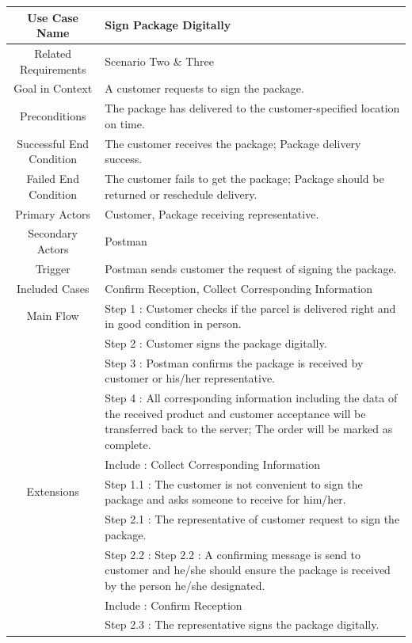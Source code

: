 \documentclass[12pt]{scrreprt}
\begin{document}
\begin{table}
  \centering
  \begin{tabular}{| c | p{11cm} |}
    \hline
    Use Case Name & Sign Package Digitally\\
    \hline
    Related Requirements & Scenario Two \& Three\\
    \hline
    Goal in Context & A customer requests to sign the package.\\
    \hline
    Preconditions & The package has delivered to the customer-specified
    location on time.\\
    \hline
    Successful End Condition & The customer receives the package; Package
    delivery success.\\
    \hline
    Failed End Condition & The customer fails to get the package; Package
    should be returned or reschedule delivery.\\
    \hline
    Primary Actors & Customer, Package receiving representative.\\
    \hline
    Secondary Actors & Postman\\
    \hline
    Trigger & Postman sends customer the request of signing the package.\\
    \hline
    Included Cases & Confirm Reception, Collect Corresponding Information\\
    \hline
    Main Flow & Step 1 : Customer checks if the parcel is delivered right and
    in good condition in person.\\
    & Step 2 : Customer signs the package digitally.\\
    & Step 3 : Postman confirms the package is received by customer or his/her
    representative.\\
    & Step 4 : All corresponding information including the data of the received
    product and customer acceptance will be transferred back to the server;
    The order will be marked as complete.\\
    & Include : Collect Corresponding Information\\
    \hline
    Extensions & Step 1.1 : The customer is not convenient to sign the package
    and asks someone to receive for him/her.\\
    & Step 2.1 : The representative of customer request to sign the package.\\
    & Step 2.2 : Step 2.2 : A confirming message is send to customer and he/she
    should ensure the package is received by the person he/she designated.\\
    & Include : Confirm Reception\\
    & Step 2.3 : The representative signs the package digitally.\\
    \hline
  \end{tabular}
\end{table}
\end{document}
